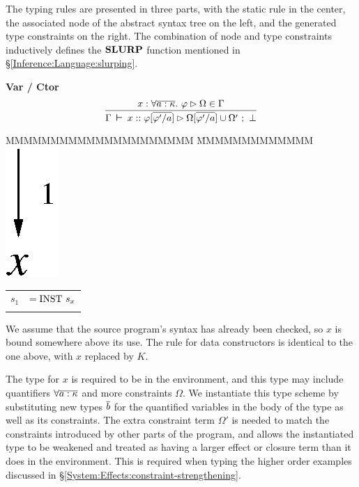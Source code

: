 The typing rules are presented in three parts, with the static rule in the center, the associated node of the abstract syntax tree on the left, and the generated type constraints on the right. The combination of node and type constraints inductively defines the $\textrm{\textbf{SLURP}}$ function mentioned in \S\ref{Inference:Language:slurping}.

\clearpage{}
\textbf{Var / Ctor}
$$
\begin{aligned}
	\frac	{x : \forall \ov{a : \kappa}. \ \varphi \rhd \Omega \in \Gamma}
		{\Gamma \judge x :: \varphi[\ov{\varphi'/a}] 
					\rhd \Omega[\ov{\varphi'/a}] \cup \Omega' \ ; \ \bot}
\end{aligned}
$$

\begin{tabbing}
MMMMMMMMMMMMMMMMMMMMM \= MMMMMMMMMMMMM \kill
	\hspace{10em}\includegraphics[scale=0.6]{3-Inference/fig/constraints/var}	
	\> 
	\begin{tabular}{ll}
		$s_1$ 	& $= \rINST \ s_x$ \\
		\\
       	\end{tabular}
\end{tabbing}

We assume that the source program's syntax has already been checked, so $x$ is bound somewhere above its use. The rule for data constructors is identical to the one above, with $x$ replaced by $K$.

The type for $x$ is required to be in the environment, and this type may include quantifiers $\forall \overline{a : \kappa}$ and more constraints $\Omega$. We instantiate this type scheme by substituting new types $\overline{b}$ for the quantified variables in the body of the type as well as its constraints. The extra constraint term $\Omega'$ is needed to match the constraints introduced by other parts of the program, and allows the instantiated type to be weakened and treated as having a larger effect or closure term than it does in the environment. This is required when typing the higher order examples discussed in \S\ref{System:Effects:constraint-strengthening}.


